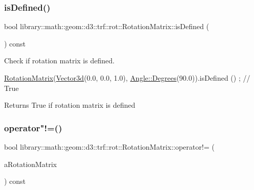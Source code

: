 \subsubsection{\texorpdfstring{is\+Defined()}{isDefined()}}
{\footnotesize\ttfamily bool library\+::math\+::geom\+::d3\+::trf\+::rot\+::\+Rotation\+Matrix\+::is\+Defined (\begin{DoxyParamCaption}{ }\end{DoxyParamCaption}) const}



Check if rotation matrix is defined. 


\begin{DoxyCode}
\hyperlink{classlibrary_1_1math_1_1geom_1_1d3_1_1trf_1_1rot_1_1_rotation_matrix_a7f1184694020cb4f963d58931324ab06}{RotationMatrix}(\hyperlink{namespacelibrary_1_1math_1_1obj_a977e84e9bf317a4e7dd9d6d671d6da2f}{Vector3d}(0.0, 0.0, 1.0), \hyperlink{classlibrary_1_1math_1_1geom_1_1_angle_a64aa53e8420aeb6f671d86c65c370bc8}{Angle::Degrees}(90.0)).isDefined
      () ; \textcolor{comment}{// True}
\end{DoxyCode}


\begin{DoxyReturn}{Returns}
True if rotation matrix is defined 
\end{DoxyReturn}
\mbox{\label{classlibrary_1_1math_1_1geom_1_1d3_1_1trf_1_1rot_1_1_rotation_matrix_a7aabde35abe3bf30b5f38ab986e64f34}} 
\subsubsection{\texorpdfstring{operator"!=()}{operator!=()}}
{\footnotesize\ttfamily bool library\+::math\+::geom\+::d3\+::trf\+::rot\+::\+Rotation\+Matrix\+::operator!= (\begin{DoxyParamCaption}\item[{const \hyperlink{classlibrary_1_1math_1_1geom_1_1d3_1_1trf_1_1rot_1_1_rotation_matrix}{Rotation\+Matrix} \&}]{a\+Rotation\+Matrix }\end{DoxyParamCaption}) const}



